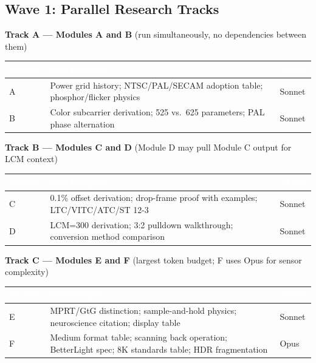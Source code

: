 \documentclass[11pt,letterpaper]{article}
\newcommand{\tableheader}[1]{\textbf{\sffamily\textcolor{white}{#1}}}
\begin{document}
\subsection{Wave 1: Parallel Research Tracks}

\textbf{Track A --- Modules A and B} (run simultaneously, no dependencies between them)

\begin{center}
\begin{tabularx}{\textwidth}{L{2cm}XC{2cm}}
\toprule
{}
\tableheader{Module} & \tableheader{Key Outputs} & \tableheader{Model} \\
\midrule
A & Power grid history; NTSC/PAL/SECAM adoption table; phosphor/flicker physics & Sonnet \\
B & Color subcarrier derivation; 525 vs.\ 625 parameters; PAL phase alternation & Sonnet \\
\bottomrule
\end{tabularx}
\end{center}

\textbf{Track B --- Modules C and D} (Module D may pull Module C output for LCM context)

\begin{center}
\begin{tabularx}{\textwidth}{L{2cm}XC{2cm}}
\toprule
{}
\tableheader{Module} & \tableheader{Key Outputs} & \tableheader{Model} \\
\midrule
C & 0.1\% offset derivation; drop-frame proof with examples; LTC/VITC/ATC/ST 12-3 & Sonnet \\
D & LCM=300 derivation; 3:2 pulldown walkthrough; conversion method comparison & Sonnet \\
\bottomrule
\end{tabularx}
\end{center}

\textbf{Track C --- Modules E and F} (largest token budget; F uses Opus for sensor complexity)

\begin{center}
\begin{tabularx}{\textwidth}{L{2cm}XC{2cm}}
\toprule
{}
\tableheader{Module} & \tableheader{Key Outputs} & \tableheader{Model} \\
\midrule
E & MPRT/GtG distinction; sample-and-hold physics; neuroscience citation; display table & Sonnet \\
F & Medium format table; scanning back operation; BetterLight spec; 8K standards table; HDR fragmentation & Opus \\
\bottomrule
\end{tabularx}
\end{center}
\end{document}
